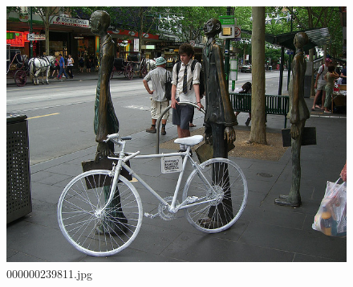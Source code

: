 \begin{figure}[h]
    \centering
    \includegraphics[width=0.8\linewidth]{../image set/hard/000000239811.jpg}
    \caption{000000239811.jpg}
\end{figure}
